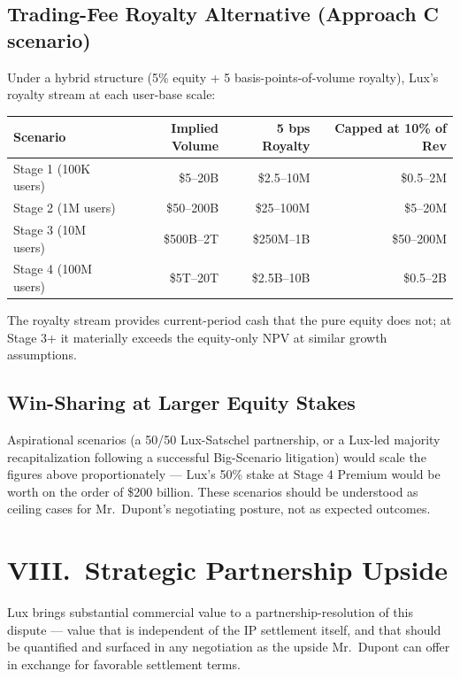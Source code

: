 \documentclass[11pt,letterpaper]{article}
\begin{document}
\subsection*{Trading-Fee Royalty Alternative (Approach C scenario)}

Under a hybrid structure (5\% equity + 5 basis-points-of-volume
royalty), Lux's royalty stream at each user-base scale:

\begin{center}
\begin{small}
\begin{tabular}{lrrr}
\toprule
\textbf{Scenario} & \textbf{Implied Volume} & \textbf{5 bps Royalty} & \textbf{Capped at 10\% of Rev} \\
\midrule
Stage 1 (100K users) & \$5--20B & \$2.5--10M & \$0.5--2M \\
Stage 2 (1M users)   & \$50--200B & \$25--100M & \$5--20M \\
Stage 3 (10M users)  & \$500B--2T & \$250M--1B & \$50--200M \\
Stage 4 (100M users) & \$5T--20T  & \$2.5B--10B & \$0.5--2B \\
\bottomrule
\end{tabular}
\end{small}
\end{center}

The royalty stream provides current-period cash that the pure equity
does not; at Stage 3+ it materially exceeds the equity-only NPV at
similar growth assumptions.

\subsection*{Win-Sharing at Larger Equity Stakes}

Aspirational scenarios (a 50/50 Lux-Satschel partnership, or a
Lux-led majority recapitalization following a successful Big-Scenario
litigation) would scale the figures above proportionately --- Lux's
50\% stake at Stage 4 Premium would be worth on the order of \$200
billion. These scenarios should be understood as ceiling cases for
Mr.\ Dupont's negotiating posture, not as expected outcomes.

\section*{VIII.\ Strategic Partnership Upside}

Lux brings substantial commercial value to a partnership-resolution
of this dispute --- value that is independent of the IP settlement
itself, and that should be quantified and surfaced in any
negotiation as the upside Mr.\ Dupont can offer in exchange for
favorable settlement terms.
\end{document}
